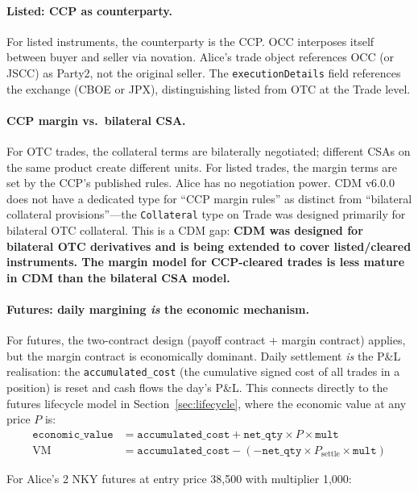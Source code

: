 \documentclass[11pt,a4paper]{article}
\begin{document}
\paragraph{Listed: CCP as counterparty.} For listed instruments, the counterparty is the CCP. OCC interposes itself between buyer and seller via novation. Alice's trade object references OCC (or JSCC) as Party2, not the original seller. The \texttt{executionDetails} field references the exchange (CBOE or JPX), distinguishing listed from OTC at the Trade level.

\paragraph{CCP margin vs.\ bilateral CSA.} For OTC trades, the collateral terms are bilaterally negotiated; different CSAs on the same product create different units. For listed trades, the margin terms are set by the CCP's published rules. Alice has no negotiation power. CDM v6.0.0 does not have a dedicated type for ``CCP margin rules'' as distinct from ``bilateral collateral provisions''---the \texttt{Collateral} type on Trade was designed primarily for bilateral OTC collateral. This is a CDM gap: \textbf{CDM was designed for bilateral OTC derivatives and is being extended to cover listed/cleared instruments. The margin model for CCP-cleared trades is less mature in CDM than the bilateral CSA model.}

\paragraph{Futures: daily margining \emph{is} the economic mechanism.} For futures, the two-contract design (payoff contract + margin contract) applies, but the margin contract is economically dominant. Daily settlement \emph{is} the P\&L realisation: the \texttt{accumulated\_cost} (the cumulative signed cost of all trades in a position) is reset and cash flows the day's P\&L. This connects directly to the futures lifecycle model in Section~\ref{sec:lifecycle}, where the economic value at any price $P$ is:
\begin{align*}
\texttt{economic\_value} &= \texttt{accumulated\_cost} + \texttt{net\_qty} \times P \times \texttt{mult} \\
\text{VM} &= \texttt{accumulated\_cost} - (-\texttt{net\_qty} \times P_{\text{settle}} \times \texttt{mult})
\end{align*}

\noindent For Alice's 2 NKY futures at entry price 38,500 with multiplier 1,000:
\end{document}
